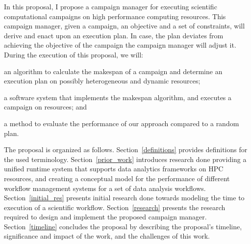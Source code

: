 In this proposal, I propose a campaign manager for executing scientific computational campaigns on high performance computing resources.
This campaign manager, given a campaign, an objective and a set of constraints, will derive and enact upon an execution plan. In case, the plan deviates from achieving the objective of the campaign the campaign manager will adjust it.
During the execution of this proposal, we 
will:
\begin{inparaenum}[(1)]
\item an algorithm to calculate the makespan of a campaign and determine an execution plan on possibly heterogeneous and dynamic resources;
\item a software system that implements the makespan algorithm, and executes a campaign on resources; and 
\item a method to evaluate the performance of our approach compared to a random plan. 
\end{inparaenum}

The proposal is organized as follows.
Section~\ref{definitions} provides definitions for the used terminology.
Section~\ref{prior_work} introduces research done providing a unified runtime system that supports data analytics frameworks on HPC resources, and creating a conceptual model for the performance of different workflow management systems for a set of data analysis workflows.
Section~\ref{initial_res} presents initial research done towards modeling the time to execution of a scientific workflow.
Section~\ref{research} presents the research required to design and implement the proposed campaign manager.
Section~\ref{timeline} concludes the proposal by describing the proposal's timeline, significance and impact of the work, and the challenges of this work.